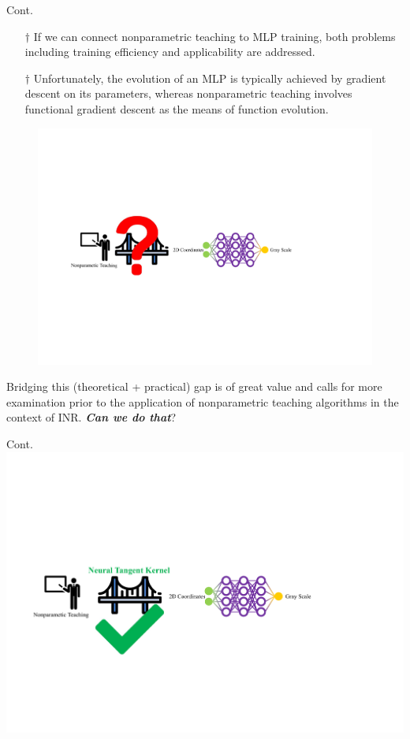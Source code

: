 \documentclass[aspectratio=169,xcolor=dvipsnames]{beamer}
\begin{document}
\begin{frame}{Cont.}
    \justify
    \begin{itemize}
        \item[$\bm{\dagger}$] If we can \alert{connect} nonparametric teaching \alert{to} MLP training, both problems including training efficiency and applicability are addressed. 
        \item[$\bm{\dagger}$] Unfortunately, the evolution of an MLP is typically achieved by \alert{gradient descent on its parameters}, whereas nonparametric teaching involves \alert{functional gradient descent} as the means of function evolution. 
        \end{itemize}

\begin{figure}
    \centering
    \includegraphics[width=0.7\linewidth]{Source/Qbridge.pdf}
\end{figure}
\vspace{-1em}

Bridging this (theoretical + practical) \alert{gap} is of great value and calls for more examination prior to the application of \alert{nonparametric teaching algorithms} in the context of \alert{INR}. \textbf{\textit{Can we do that}}?
\end{frame}

\begin{frame}{Cont.}
\includegraphics[width=\linewidth]{Source/Cbridge.pdf}
\end{frame}
\end{document}
